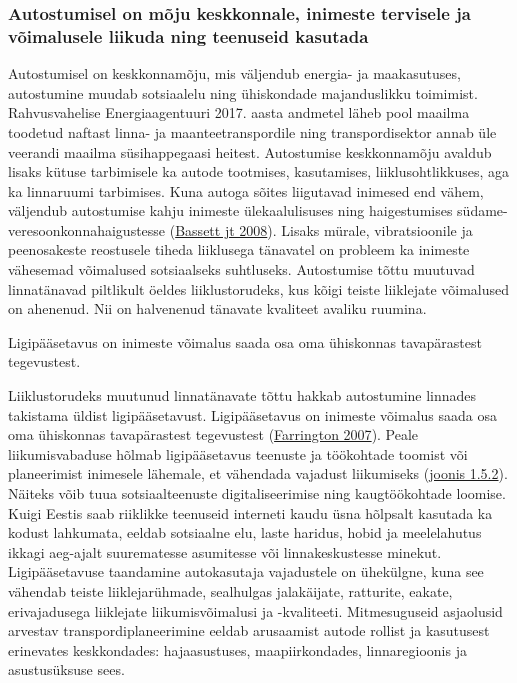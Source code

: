 \documentclass[estonian,]{article}
\begin{document}
\hypertarget{autostumisel-on-muxf5ju-keskkonnale-inimeste-tervisele-ja-vuxf5imalusele-liikuda-ning-teenuseid-kasutada}{%
\subsubsection*{Autostumisel on mõju keskkonnale, inimeste tervisele ja võimalusele liikuda ning teenuseid kasutada}\label{autostumisel-on-muxf5ju-keskkonnale-inimeste-tervisele-ja-vuxf5imalusele-liikuda-ning-teenuseid-kasutada}}

Autostumisel on keskkonnamõju, mis väljendub energia- ja maakasutuses, autostumine muudab sotsiaalelu ning ühiskondade majanduslikku toimimist. Rahvusvahelise Energiaagentuuri 2017. aasta andmetel läheb pool maailma toodetud naftast linna- ja maanteetranspordile ning transpordisektor annab üle veerandi maailma süsihappegaasi heitest. Autostumise keskkonnamõju avaldub lisaks kütuse tarbimisele ka autode tootmises, kasutamises, liiklusohtlikkuses, aga ka linnaruumi tarbimises. Kuna autoga sõites liigutavad inimesed end vähem, väljendub autostumise kahju inimeste ülekaalulisuses ning haigestumises südame-veresoonkonnahaigustesse (\protect\hyperlink{Bassett}{Bassett jt 2008}). Lisaks mürale, vibratsioonile ja peenosakeste reostusele tiheda liiklusega tänavatel on probleem ka inimeste vähesemad võimalused sotsiaalseks suhtluseks. Autostumise tõttu muutuvad linnatänavad piltlikult öeldes liiklustorudeks, kus kõigi teiste liiklejate võimalused on ahenenud. Nii on halvenenud tänavate kvaliteet avaliku ruumina.

\begin{blockquote-right}
Ligipääsetavus on inimeste võimalus saada osa oma ühiskonnas
tavapärastest tegevustest.
\end{blockquote-right}

Liiklustorudeks muutunud linnatänavate tõttu hakkab autostumine linnades takistama üldist ligipääsetavust. Ligipääsetavus on inimeste võimalus saada osa oma ühiskonnas tavapärastest tegevustest (\protect\hyperlink{Farrington}{Farrington 2007}). Peale liikumisvabaduse hõlmab ligipääsetavus teenuste ja töökohtade toomist või planeerimist inimesele lähemale, et vähendada vajadust liikumiseks (\protect\hyperlink{figure152}{joonis 1.5.2}). Näiteks võib tuua sotsiaalteenuste digitaliseerimise ning kaugtöökohtade loomise. Kuigi Eestis saab riiklikke teenuseid interneti kaudu üsna hõlpsalt kasutada ka kodust lahkumata, eeldab sotsiaalne elu, laste haridus, hobid ja meelelahutus ikkagi aeg-ajalt suurematesse asumitesse või linnakeskustesse minekut. Ligipääsetavuse taandamine autokasutaja vajadustele on ühekülgne, kuna see vähendab teiste liiklejarühmade, sealhulgas jalakäijate, ratturite, eakate, erivajadusega liiklejate liikumisvõimalusi ja -kvaliteeti. Mitmesuguseid asjaolusid arvestav transpordiplaneerimine eeldab arusaamist autode rollist ja kasutusest erinevates keskkondades: hajaasustuses, maapiirkondades, linnaregioonis ja asustusüksuse sees.
\end{document}

